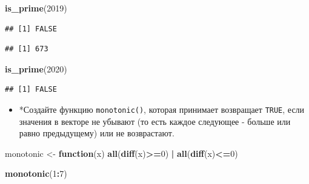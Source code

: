 \documentclass[]{book}
\newenvironment{Shaded}{\begin{snugshade}}{\end{snugshade}}
\newcommand{\KeywordTok}[1]{\textcolor[rgb]{0.13,0.29,0.53}{\textbf{#1}}}
\newcommand{\DecValTok}[1]{\textcolor[rgb]{0.00,0.00,0.81}{#1}}
\newcommand{\StringTok}[1]{\textcolor[rgb]{0.31,0.60,0.02}{#1}}
\newcommand{\CommentTok}[1]{\textcolor[rgb]{0.56,0.35,0.01}{\textit{#1}}}
\newcommand{\ControlFlowTok}[1]{\textcolor[rgb]{0.13,0.29,0.53}{\textbf{#1}}}
\newcommand{\OperatorTok}[1]{\textcolor[rgb]{0.81,0.36,0.00}{\textbf{#1}}}
\newcommand{\NormalTok}[1]{#1}
\providecommand{\tightlist}{%
  \setlength{\itemsep}{0pt}\setlength{\parskip}{0pt}}
\begin{document}
\begin{Shaded}
\begin{Highlighting}[]
\KeywordTok{is_prime}\NormalTok{(}\DecValTok{2019}\NormalTok{)}
\end{Highlighting}
\end{Shaded}

\begin{verbatim}
## [1] FALSE
\end{verbatim}

\begin{Shaded}
\end{Shaded}

\begin{verbatim}
## [1] 673
\end{verbatim}

\begin{Shaded}
\begin{Highlighting}[]
\KeywordTok{is_prime}\NormalTok{(}\DecValTok{2020}\NormalTok{)}
\end{Highlighting}
\end{Shaded}

\begin{verbatim}
## [1] FALSE
\end{verbatim}

\begin{itemize}
\tightlist
\item
  *Создайте функцию \texttt{monotonic()}, которая принимает возвращает
  \texttt{TRUE}, если значения в векторе не убывают (то есть каждое
  следующее - больше или равно предыдущему) или не возврастают.
\end{itemize}

\begin{Shaded}
\begin{Highlighting}[]
\NormalTok{monotonic <-}\StringTok{ }\ControlFlowTok{function}\NormalTok{(x) }\KeywordTok{all}\NormalTok{(}\KeywordTok{diff}\NormalTok{(x)}\OperatorTok{>=}\DecValTok{0}\NormalTok{) }\OperatorTok{|}\StringTok{ }\KeywordTok{all}\NormalTok{(}\KeywordTok{diff}\NormalTok{(x)}\OperatorTok{<=}\DecValTok{0}\NormalTok{)}
\end{Highlighting}
\end{Shaded}

\begin{Shaded}
\begin{Highlighting}[]
\KeywordTok{monotonic}\NormalTok{(}\DecValTok{1}\OperatorTok{:}\DecValTok{7}\NormalTok{)}
\end{Highlighting}
\end{Shaded}
\end{document}
